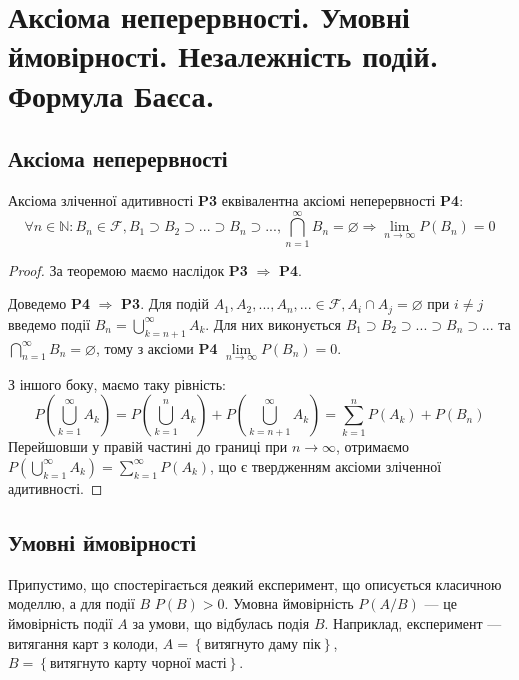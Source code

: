 \section{Аксіома неперервності. Умовні ймовірності. Незалежність подій. Формула Баєса.}

\subsection{Аксіома неперервності}
\begin{theorem}
    Аксіома зліченної адитивності \textbf{P3} еквівалентна аксіомі неперервності
    \textbf{P4}: $$\forall n \in \mathbb{N}: B_n \in \mathcal{F}, B_1 \supset B_2 \supset ... \supset B_n \supset ..., \bigcap\limits_{n=1}^{\infty} B_n = \varnothing \Rightarrow \lim_{n\rightarrow \infty} P(B_n) = 0$$
    \begin{proof}
        За теоремою  маємо наслідок \textbf{P3} $\Rightarrow$ \textbf{P4}.

        Доведемо \textbf{P4} $\Rightarrow$ \textbf{P3}. Для подій $A_1, A_2, ... , A_n, ... \in \mathcal{F}, A_i \cap A_j = \varnothing \text{ при } i \neq j$
        введемо події $B_n = \bigcup\limits_{k=n+1}^{\infty} A_k$. Для них виконується $B_1 \supset B_2 \supset ... \supset B_n \supset ...$ та $\bigcap\limits_{n=1}^{\infty} B_n = \varnothing$,
        тому з аксіоми \textbf{P4} $\lim\limits_{n\rightarrow \infty} P(B_n) = 0$.

        З іншого боку, маємо таку рівність:
        $$P\left(\bigcup\limits_{k=1}^{\infty} A_k\right) = P\left(\bigcup\limits_{k=1}^{n} A_k\right) + P\left(\bigcup\limits_{k=n+1}^{\infty} A_k\right) = \sum\limits_{k=1}^{n} P(A_k) + P(B_n)$$
        Перейшовши у правій частині до границі при $n \rightarrow \infty$, отримаємо $P\left(\bigcup\limits_{k=1}^{\infty} A_k\right) = \sum\limits_{k=1}^{\infty} P(A_k)$, 
        що є твердженням аксіоми зліченної адитивності.
    \end{proof}
\end{theorem}

\subsection{Умовні ймовірності}
Припустимо, що спостерігається деякий експеримент, що описується класичною моделлю, а для події $B$ $P(B)>0$.
Умовна ймовірність $P(A/B)$ --- це ймовірність події $A$ за умови, що відбулась подія $B$.
Наприклад, експеримент --- витягання карт з колоди, $A=\left\{\text{витягнуто даму пік}\right\}$, $B=\left\{\text{витягнуто карту чорної масті}\right\}$.

